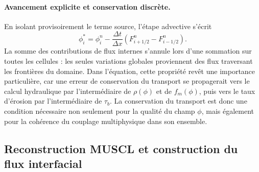 \documentclass[11pt,a4paper]{report}
\newcommand{\dt}{\Delta t}
\begin{document}
\paragraph{Avancement explicite et conservation discrète.} En isolant provisoirement le terme source,
l'étape advective s'écrit
\begin{equation}
\phi_i^* = \phi_i^n - \frac{\dt}{\Delta x}\left(F_{i+1/2}^n - F_{i-1/2}^n\right).
\label{eq:update-fv}
\end{equation}
La somme des contributions de flux internes s'annule lors d'une sommation sur toutes les cellules : les
seules variations globales proviennent des flux traversant les frontières du domaine. Dans l'équation,
cette propriété revêt une importance particulière, car une erreur de conservation du transport se
propagerait vers le calcul hydraulique par l'intermédiaire de \(\rho(\phi)\) et de \(f_m(\phi)\), puis vers
le taux d'érosion par l'intermédiaire de \(\tau_b\). La conservation du transport est donc une condition
nécessaire non seulement pour la qualité du champ \(\phi\), mais également pour la cohérence du couplage
multiphysique dans son ensemble.

\subsection{Reconstruction MUSCL et construction du flux interfacial}
\end{document}
